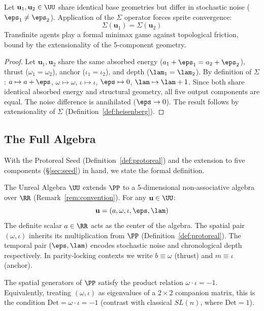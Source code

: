 \begin{theorem}\label{thm:game-ext}
Let $\mathbf{u}_1, \mathbf{u}_2 \in \UU$ share identical base geometries but differ in stochastic noise ($\eps_1 \neq \eps_2$). Application of the $\Sigma$ operator forces sprite convergence:
$$\Sigma(\mathbf{u}_1) = \Sigma(\mathbf{u}_2)$$
Transfinite agents play a formal minimax game against topological friction, bound by the extensionality of the 5-component geometry.
\end{theorem}

\begin{proof}
Let $\mathbf{u}_1, \mathbf{u}_2$ share the same absorbed energy ($a_1 + \eps_1 = a_2 + \eps_2$), thrust ($\omega_1 = \omega_2$), anchor ($\iota_1 = \iota_2$), and depth ($\lam_1 = \lam_2$). By definition of $\Sigma$: $a \mapsto a + \eps$, $\omega \mapsto \omega$, $\iota \mapsto \iota$, $\eps \mapsto 0$, $\lam \mapsto \lam + 1$. Since both share identical absorbed energy and structural geometry, all five output components are equal. The noise difference is annihilated ($\eps \to 0$). The result follows by extensionality of $\Sigma$ (Definition~\ref{def:heisenberg}). \qedhere
\end{proof}

\subsection{The Full Algebra}

With the Protoreal Seed (Definition~\ref{def:protoreal}) and the extension to five components (\S\ref{sec:seed}) in hand, we state the formal definition.

\begin{definition}\label{def:heisenberg}
The Unreal Algebra $\UU$ extends $\PP$ to a 5-dimensional non-associative algebra over $\RR$ (Remark~\ref{rem:convention}). For any $\mathbf{u} \in \UU$:
$$\mathbf{u} = (a, \omega, \iota, \eps, \lam)$$
The definite scalar $a \in \RR$ acts as the center of the algebra. The spatial pair $(\omega, \iota)$ inherits its multiplication from $\PP$ (Definition~\ref{def:protoreal}). The temporal pair $(\eps, \lam)$ encodes stochastic noise and chronological depth respectively. In parity-locking contexts we write $b \equiv \omega$ (thrust) and $m \equiv \iota$ (anchor).
\end{definition}

\begin{definition}\label{def:sl-1}\label{thm:bridge}
The spatial generators of $\PP$ satisfy the product relation $\omega \cdot \iota = -1$. Equivalently, treating $(\omega, \iota)$ as eigenvalues of a $2 \times 2$ companion matrix, this is the condition $\mathrm{Det} = \omega \cdot \iota = -1$ (contrast with classical $SL(n)$, where $\mathrm{Det} = 1$).
\end{definition}

